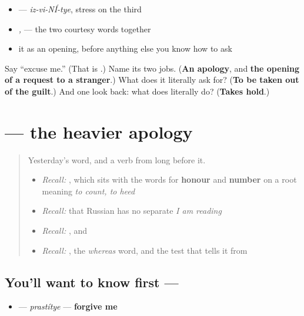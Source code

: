 \begin{itemize}
\raggedright
  \item \emph{} — \emph{iz-vi-NÍ-tye}, stress on the third
  \item \emph{, } — the two courtesy words together
  \item it as an opening, before anything else you know how to ask
\end{itemize}

\begin{tcolorbox}[breakable,colback=teal!4,colframe=teal!35!black,title={Before you move on}]
Say \textquotedblleft{}excuse me.\textquotedblright{} (That is \textbf{}.) Name its two jobs. (\textbf{An apology}, and \textbf{the opening of a request to a stranger}.) What does it literally ask for? (\textbf{To be taken out of the guilt}.) And one look back: what does \emph{} literally do? (\textbf{Takes hold}.)
\end{tcolorbox}
\section[\texorpdfstring{\ru{простите} (prastítye)}{простите (prastítye)}]{ — the heavier apology}

\label{lesson:RU-C21-prostite}



\begin{quote}
Yesterday's word, and a verb from long before it.

\begin{itemize}
\raggedright
  \item \emph{Recall:} \emph{}, which sits with the words for \textbf{honour} and \textbf{number} on a root meaning \emph{to count, to heed}
  \item \emph{Recall:} that Russian has no separate \emph{I am reading}
  \item \emph{Recall:} \emph{}, and \emph{}
  \item \emph{Recall:} \emph{}, the \emph{whereas} word, and the test that tells it from \emph{}
\end{itemize}
\end{quote}

\subsection*{You'll want to know first — }
\begin{itemize}
\raggedright
  \item \textbf{} — \emph{prastítye} — \textbf{forgive me}
\end{itemize}


